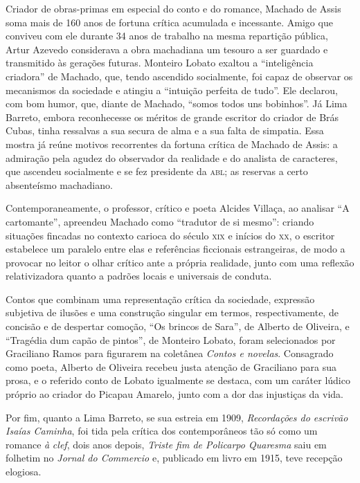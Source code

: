 Criador de obras-primas em especial do conto e do romance, Machado de
Assis soma mais de 160 anos de fortuna crítica acumulada e incessante.
Amigo que conviveu com ele durante 34 anos de trabalho na mesma
repartição pública, Artur Azevedo considerava a obra machadiana um
tesouro a ser guardado e transmitido às gerações futuras. Monteiro
Lobato exaltou a ``inteligência criadora'' de Machado, que, tendo
ascendido socialmente, foi capaz de observar os mecanismos da sociedade
e atingiu a ``intuição perfeita de tudo''. Ele declarou, com bom humor,
que, diante de Machado, ``somos todos uns bobinhos''. Já Lima Barreto,
embora reconhecesse os méritos de grande escritor do criador de Brás
Cubas, tinha ressalvas a sua secura de alma e a sua falta de simpatia.
Essa mostra já reúne motivos recorrentes da fortuna crítica de Machado
de Assis: a admiração pela agudez do observador da realidade e do
analista de caracteres, que ascendeu socialmente e se fez presidente da
\textsc{abl}; as reservas a certo absenteísmo machadiano.

Contemporaneamente, o professor, crítico e poeta Alcides Villaça, ao
analisar ``A cartomante'', apreendeu Machado como ``tradutor de si
mesmo'': criando situações fincadas no contexto carioca do século \textsc{xix} e
inícios do \textsc{xx}, o escritor estabelece um paralelo entre elas e
referências ficcionais estrangeiras, de modo a provocar no leitor o
olhar crítico ante a própria realidade, junto com uma reflexão
relativizadora quanto a padrões locais e universais de conduta.

Contos que combinam uma representação crítica da sociedade, expressão
subjetiva de ilusões e uma construção singular em termos,
respectivamente, de concisão e de despertar comoção, ``Os brincos de
Sara'', de Alberto de Oliveira, e ``Tragédia dum capão de pintos'', de
Monteiro Lobato, foram selecionados por Graciliano Ramos para figurarem
na coletânea \emph{Contos e novelas}. Consagrado como poeta, Alberto de
Oliveira recebeu justa atenção de Graciliano para sua prosa, e o
referido conto de Lobato igualmente se destaca, com um caráter lúdico
próprio ao criador do Picapau Amarelo, junto com a dor das injustiças da
vida.

Por fim, quanto a Lima Barreto, se sua estreia em 1909,
\emph{Recordações do escrivão Isaías Caminha}, foi tida pela crítica dos
contemporâneos tão só como um romance \emph{à} \emph{clef}, dois anos
depois, \emph{Triste fim de Policarpo Quaresma} saiu em folhetim no
\emph{Jornal do Commercio} e, publicado em livro em 1915, teve recepção
elogiosa.

